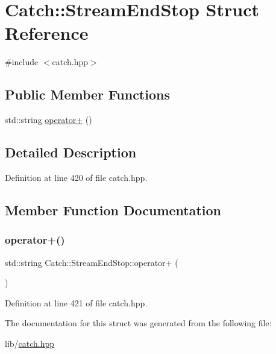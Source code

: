 \hypertarget{struct_catch_1_1_stream_end_stop}{}\section{Catch\+:\+:Stream\+End\+Stop Struct Reference}
\label{struct_catch_1_1_stream_end_stop}


{\ttfamily \#include $<$catch.\+hpp$>$}

\subsection*{Public Member Functions}
\begin{DoxyCompactItemize}
\item 
std\+::string \hyperlink{struct_catch_1_1_stream_end_stop_a3025092e06c224e0845f2caa07b26d0e}{operator+} ()
\end{DoxyCompactItemize}


\subsection{Detailed Description}


Definition at line 420 of file catch.\+hpp.



\subsection{Member Function Documentation}
\hypertarget{struct_catch_1_1_stream_end_stop_a3025092e06c224e0845f2caa07b26d0e}{}\label{struct_catch_1_1_stream_end_stop_a3025092e06c224e0845f2caa07b26d0e} 
\subsubsection{\texorpdfstring{operator+()}{operator+()}}
{\footnotesize\ttfamily std\+::string Catch\+::\+Stream\+End\+Stop\+::operator+ (\begin{DoxyParamCaption}{ }\end{DoxyParamCaption})\hspace{0.3cm}{\ttfamily [inline]}}



Definition at line 421 of file catch.\+hpp.



The documentation for this struct was generated from the following file\+:\begin{DoxyCompactItemize}
\item 
lib/\hyperlink{catch_8hpp}{catch.\+hpp}\end{DoxyCompactItemize}
